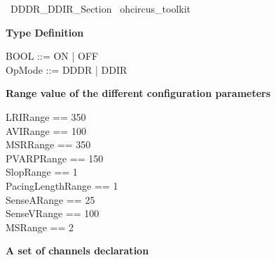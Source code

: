 \begin{zsection}
  \SECTION\ DDDR\_DDIR\_Section \parents\ ohcircus\_toolkit
\end{zsection}


\hline
\textbf{Type Definition}
\hline

\begin{zed}
  BOOL ::= ON | OFF \\
  OpMode ::= DDDR | DDIR
\end{zed}

\hline
\textbf{Range value of the different configuration parameters}
\hline

\begin{axdef}
  LRIRange == 350 \\            %
  AVIRange == 100 \\             %
  MSRRange == 350 \\            %
  PVARPRange == 150 \\           %
  SlopRange == 1 \\               %
  PacingLengthRange == 1 \\        %
  SenseARange == 25 \\            %
  SenseVRange == 100 \\         %
  MSRange == 2                    %
\end{axdef}


\hline
\textbf{A set of channels declaration }
\hline

